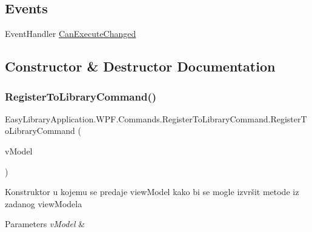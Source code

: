 \subsection*{Events}
\begin{DoxyCompactItemize}
\item 
Event\+Handler \mbox{\hyperlink{class_easy_library_application_1_1_w_p_f_1_1_commands_1_1_register_to_library_command_a41346ef92909df69a7eda23d52301898}{Can\+Execute\+Changed}}
\end{DoxyCompactItemize}


\subsection{Constructor \& Destructor Documentation}
\mbox{\label{class_easy_library_application_1_1_w_p_f_1_1_commands_1_1_register_to_library_command_a0c74cacb9c4e0bdc5d05d7c51ca0fb91}} 
\subsubsection{\texorpdfstring{Register\+To\+Library\+Command()}{RegisterToLibraryCommand()}}
{\footnotesize\ttfamily Easy\+Library\+Application.\+W\+P\+F.\+Commands.\+Register\+To\+Library\+Command.\+Register\+To\+Library\+Command (\begin{DoxyParamCaption}\item[{\mbox{\hyperlink{class_easy_library_application_1_1_w_p_f_1_1_view_model_1_1_register_to_library_view_model}{Register\+To\+Library\+View\+Model}}}]{v\+Model }\end{DoxyParamCaption})}



Konstruktor u kojemu se predaje view\+Model kako bi se mogle izvršit metode iz zadanog view\+Modela 


\begin{DoxyParams}{Parameters}
{\em v\+Model} & \\
\hline
\end{DoxyParams}


